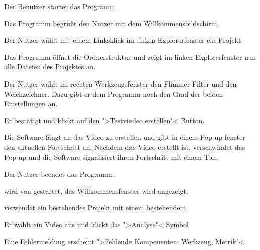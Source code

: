   \begin{compactenum}[1]
\item Der Benutzer startet das Programm.
\item Das Programm begrüßt den Nutzer mit dem Willkommensbildschirm.
\item Der Nutzer wählt mit einem Linksklick im linken Explorerfenster ein Projekt.
\item Das Programm öffnet die Ordnerstruktur und zeigt im linken Explorerfenster nun alle Dateien des Projektes an.
\item Der Nutzer wählt im rechten Werkzeugsfenster den Flimmer Filter und den Weichzeichner. Dazu gibt er dem Programm noch den Grad der beiden Einstellungen an.
\item Er bestätigt und klickt auf den ">Testviedeo erstellen"< Button.
\item Die Software fängt an das Video zu erstellen und gibt in einem Pop-up fenster den aktuellen Fortschritt an. Nachdem das Video erstellt ist, verschwindet das Pop-up und die Software signalisiert ihren Fortschritt mit einem Ton.
\item Der Nutzer beendet das Programm.
\end{compactenum}

\begin{compactenum}[1]
\item \projektTitel wird von \dAU gestartet, das Willkommensfenster wird angezeigt.
\item \dAU verwendet ein bestehendes Projekt mit einem bestehendem 
\item Er wählt ein Video aus und klickt das ">Analyse"< Symbol
\item Eine Fehlermeldung erscheint ">Fehlende Komponenten: Werkzeug, Metrik"<
\end{compactenum}